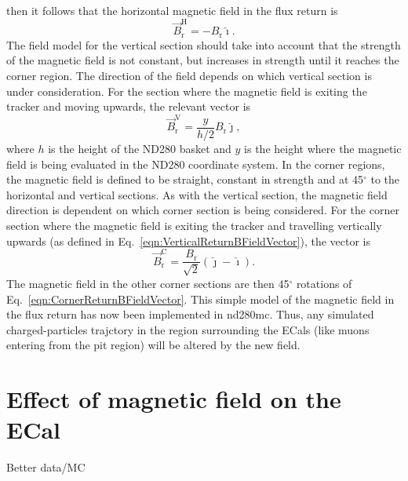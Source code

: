 then it follows that the horizontal magnetic field in the flux return is
\begin{equation}
  \overrightarrow{B}^{\textrm{H}}_{\textrm{r}} = -{B_{\textrm{r}}}\hat{\imath}.
  \label{eqn:HorizontalReturnBFieldVector}
\end{equation}
The field model for the vertical section should take into account that the strength of the magnetic field is not constant, but increases in strength until it reaches the corner region.  The direction of the field depends on which vertical section is under consideration.  For the section where the magnetic field is exiting the tracker and moving upwards, the relevant vector is
\begin{equation}
  \overrightarrow{B}^{\textrm{V}}_{\textrm{r}} = \frac{y}{h/2}{B_{\textrm{r}}}\hat{\jmath},
  \label{eqn:VerticalReturnBFieldVector}
\end{equation}
where $h$ is the height of the ND280 basket and $y$ is the height where the magnetic field is being evaluated in the ND280 coordinate system.  In the corner regions, the magnetic field is defined to be straight, constant in strength and at 45$^\circ$ to the horizontal and vertical sections.  As with the vertical section, the magnetic field direction is dependent on which corner section is being considered.  For the corner section where the magnetic field is exiting the tracker and travelling vertically upwards (as defined in Eq.~\ref{eqn:VerticalReturnBFieldVector}), the vector is
\begin{equation}
  \overrightarrow{B}^{\textrm{C}}_{\textrm{r}} = \frac{B_{\textrm{r}}}{\sqrt{2}}(\hat{\jmath} - \hat{\imath}).
  \label{eqn:CornerReturnBFieldVector}
\end{equation}
The magnetic field in the other corner sections are then 45$^\circ$ rotations of Eq.~\ref{eqn:CornerReturnBFieldVector}.
\newline
\newline
This simple model of the magnetic field in the flux return has now been implemented in nd280mc.  Thus, any simulated charged-particles trajctory in the region surrounding the ECals (like muons entering from the pit region) will be altered by the new field.

\section{Effect of magnetic field on the ECal}
\label{sec:MagneticFieldEffect}
Better data/MC
